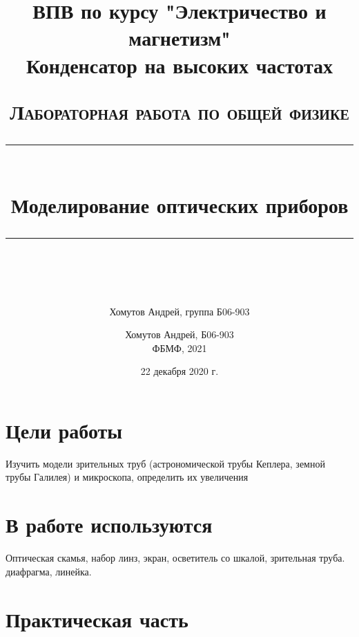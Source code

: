 \documentclass[a4paper, 12pt]{article}
\author{Хомутов Андрей, группа Б06-903}
\title{ВПВ по курсу "Электричество и магнетизм" \\ Конденсатор на высоких частотах}
\date{22 декабря 2020 г.}
\newcommand{\HRule}[1]{\rule{\linewidth}{#1}}
\begin{document}
\title{ \normalsize \textsc{Лабораторная работа по общей физике}
		\\ [4.0cm]
		\HRule{0.5pt} \\ [0.3cm]
		\LARGE \textbf{{Моделирование оптических приборов}}
		\HRule{0.5pt} \\ [0.1cm]
		\normalsize  \vspace*{18\baselineskip}}

\date{}

\author{%
		Хомутов Андрей, Б06-903 \\
ФБМФ, 2021\\ }

\maketitle
\thispagestyle{empty}
\newpage
\section*{Цели работы} 
Изучить модели зрительных труб (астрономической трубы Кеплера, земной трубы Галилея) и микроскопа, определить их увеличения
\section*{В работе используются} 
Оптическая скамья, набор линз, экран, осветитель со шкалой, зрительная труба. диафрагма, линейка.

 


\section{Практическая часть}
\end{document}
